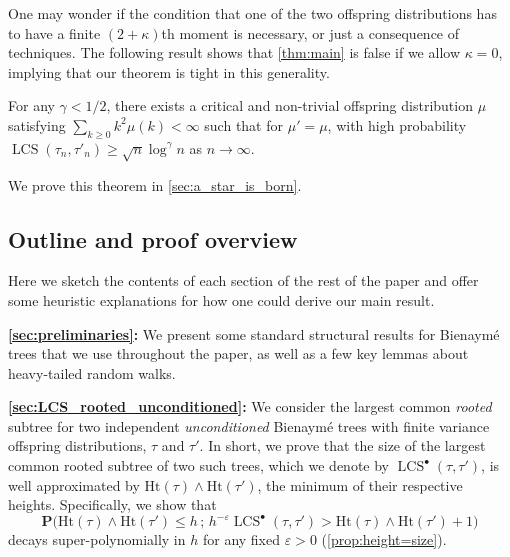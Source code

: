 \documentclass[11pt,reqno]{amsart}
\newcommand{\1}{\mathbf{1}}
\newcommand{\0}{\mathbf{0}}
\newcommand{\prob}{\mathbf{P}}
\newcommand{\Ht}{\mathrm{Ht}}
\newcommand{\LCS}{\operatorname{LCS}}
\begin{document}
One may wonder if the condition that one of the two offspring distributions has to have a finite $(2+\kappa)$th moment is necessary, or just a consequence of techniques. The following result shows that \cref{thm:main} is false if we allow $\kappa=0$, implying that our theorem is tight in this generality. 

\begin{thm}\label{thm:a_star_is_born}
    For any $\gamma < 1/2$, there exists a critical and non-trivial offspring distribution $\mu$ satisfying $\sum_{k\ge 0}k^2\mu(k)<\infty$ such that for $\mu'=\mu$, with high probability $\LCS(\tau_n,\tau'_n) \geq \sqrt{n} \log^\gamma n$ as $n\to\infty$.
\end{thm}

We prove this theorem in \cref{sec:a_star_is_born}.


\subsection{Outline and proof overview}
Here we sketch the contents of each section of the rest of the paper and offer some heuristic explanations for how one could derive our main result.  
\medskip

{\bf \cref{sec:preliminaries}:} We present some standard structural results for Bienaym\'{e} trees that we use throughout the paper, as well as a few key lemmas about heavy-tailed random walks.
\medskip

{\bf \cref{sec:LCS_rooted_unconditioned}:}  We consider the largest common \emph{rooted} subtree for two independent \emph{unconditioned} Bienaym\'{e} trees with finite variance offspring distributions, $\tau$ and $\tau'$. In short, we prove that the size of the largest common rooted subtree of two such trees, which we denote by $\LCS^\bullet(\tau,\tau')$, is well approximated by $\Ht(\tau) \wedge \Ht(\tau')$, the minimum of their respective heights. Specifically, we show that
\begin{equation}\label{eq:expression_for_bootstrap}
\prob\big( \Ht(\tau) \wedge \Ht(\tau') \leq h \,;\,  h^{-\varepsilon} \LCS^\bullet(\tau,\tau') > \Ht(\tau) \wedge \Ht(\tau')+1 \big)
\end{equation}
decays super-polynomially in $h$ for any fixed $\varepsilon > 0$ (\cref{prop:height=size}).
\smallskip
\end{document}
